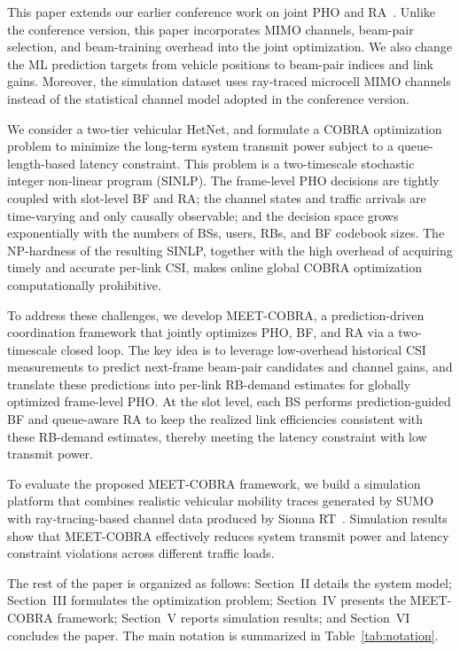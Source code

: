 \documentclass[10pt,journal,letterpaper]{IEEEtran}
\newcommand{\rev}[1]{\textcolor{revisioncolor}{{}#1}}
\newcommand{\omitted}[1]{}
\theoremstyle{remark}
\begin{document}
\rev{This paper extends our earlier conference work on joint PHO and RA~\cite{AEPHORA2025ICC}.
Unlike the conference version, this paper incorporates MIMO channels, beam-pair selection, and beam-training overhead into the joint optimization.
We also change the ML prediction targets from vehicle positions to beam-pair indices and link gains.
Moreover, the simulation dataset uses ray-traced microcell MIMO channels instead of the statistical channel model adopted in the conference version.}

We consider a two-tier vehicular HetNet, and formulate a COBRA optimization problem to minimize the long-term system transmit power subject to a queue-length-based latency constraint. 
This problem is a two-timescale stochastic integer non-linear program (SINLP)\omitted{}\rev{. The} frame-level PHO decisions are tightly coupled with slot-level BF and RA; the channel states and traffic arrivals are time-varying and only causally observable; and the decision space grows exponentially with the numbers of BSs, users, RBs, and BF codebook sizes. 
The NP-hardness of the resulting SINLP, together with the high overhead of acquiring timely and accurate per-link CSI, makes online global COBRA optimization computationally prohibitive.

To address these challenges, we develop MEET-COBRA, a prediction-driven coordination framework that jointly optimizes PHO, BF, and RA via a two-timescale closed loop. 
The key idea is to leverage low-overhead historical CSI measurements to predict next-frame beam-pair candidates and channel gains, and translate these predictions into per-link RB-demand estimates for globally optimized frame-level PHO. At the slot level, each BS performs prediction-guided BF and queue-aware RA to keep the realized link efficiencies consistent with these RB-demand estimates, thereby meeting the latency constraint with low transmit power.

To evaluate the proposed MEET-COBRA framework, we build a simulation platform that combines realistic vehicular mobility traces generated by SUMO~\cite{behrisch2011sumo} with ray-tracing-based channel data produced by Sionna RT~\cite{sionnaRT}. 
Simulation results show that MEET-COBRA effectively reduces system transmit power \omitted{}\rev{and latency constraint violations across different traffic loads.}




The rest of the paper is organized as follows: Section~II details the system model; Section~III formulates the optimization problem; Section~IV presents the MEET-COBRA framework; Section~V reports simulation results; and Section~VI concludes the paper.
\rev{The main notation is summarized in Table~\ref{tab:notation}.}
\end{document}
